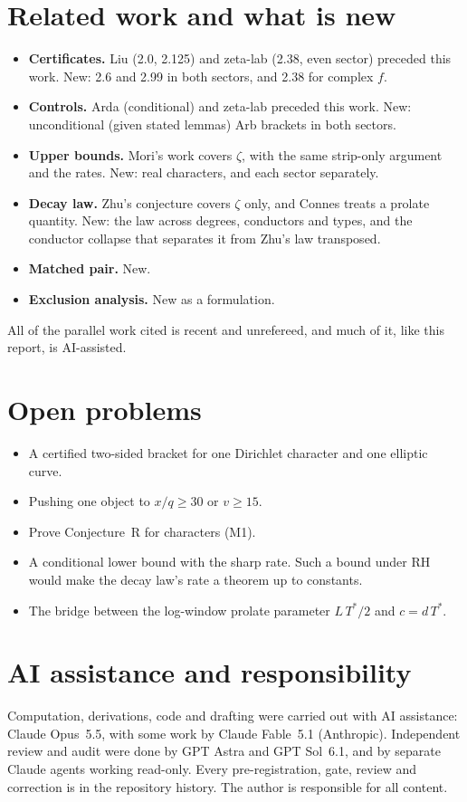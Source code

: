 \documentclass[11pt]{article}
\theoremstyle{remark}
\begin{document}
\section{Related work and what is new}\label{sec:related}
\begin{itemize}
\item \textbf{Certificates.} Liu (2.0, 2.125) and zeta-lab (2.38, even sector) preceded this work. New: 2.6 and 2.99 in both sectors, and 2.38 for complex $f$.
\item \textbf{Controls.} Arda (conditional) and zeta-lab preceded this work. New: unconditional (given stated lemmas) Arb brackets in both sectors.
\item \textbf{Upper bounds.} Mori's work covers $\zeta$, with the same strip-only argument and the rates. New: real characters, and each sector separately.
\item \textbf{Decay law.} Zhu's conjecture covers $\zeta$ only, and Connes treats a prolate quantity. New: the law across degrees, conductors and types, and the conductor collapse that separates it from Zhu's law transposed.
\item \textbf{Matched pair.} New.
\item \textbf{Exclusion analysis.} New as a formulation.
\end{itemize}
All of the parallel work cited is recent and unrefereed, and much of it, like this report, is AI-assisted.

\section{Open problems}
\begin{itemize}
\item A certified two-sided bracket for one Dirichlet character and one elliptic curve.
\item Pushing one object to $x/q\ge30$ or $v\ge15$.
\item Prove Conjecture~R for characters (M1).
\item A conditional lower bound with the sharp rate. Such a bound under RH would make the decay law's rate a theorem up to constants.
\item The bridge between the log-window prolate parameter $L\,T^*/2$ and $c=d\,T^*$.
\end{itemize}

\section*{AI assistance and responsibility}
Computation, derivations, code and drafting were carried out with AI assistance: Claude Opus~5.5, with some work by Claude Fable~5.1 (Anthropic). Independent review and audit were done by GPT Astra and GPT Sol~6.1, and by separate Claude agents working read-only. Every pre-registration, gate, review and correction is in the repository history. The author is responsible for all content.
\end{document}
